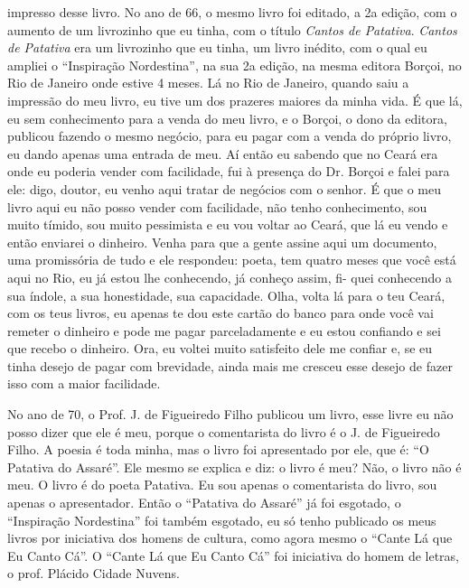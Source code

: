 impresso desse livro. No ano de 66, o mesmo livro foi editado, a 2a
edição, com o aumento de um livrozinho que eu tinha, com o título
\emph{Cantos de Patativa}. \emph{Cantos de Patativa} era um livrozinho que
eu tinha, um livro inédito, com o qual eu ampliei o ``Inspiração
Nordestina'', na sua 2a edição, na mesma editora Borçoi, no Rio de
Janeiro onde estive 4 meses. Lá no Rio de Janeiro, quando saiu a
impressão do meu livro, eu tive um dos prazeres maiores da minha vida. É
que lá, eu sem conhecimento para a venda do meu livro, e o Borçoi, o
dono da editora, publicou fazendo o mesmo negócio, para eu pagar com a
venda do próprio livro, eu dando apenas uma entrada de meu. Aí então eu
sabendo que no Ceará era onde eu poderia vender com facilidade, fui à
presença do Dr. Borçoi e falei para ele: digo, doutor, eu venho aqui
tratar de negócios com o senhor. É que o meu livro aqui eu não posso
vender com facilidade, não tenho conhecimento, sou muito tímido, sou
muito pessimista e eu vou voltar ao Ceará, que lá eu vendo e então
enviarei o dinheiro. Venha para que a gente assine aqui um documento,
uma promissória de tudo e ele respondeu: poeta, tem quatro meses que
você está aqui no Rio, eu já estou lhe conhecendo, já conheço assim, fi-
quei conhecendo a sua índole, a sua honestidade, sua capacidade. Olha,
volta lá para o teu Ceará, com os teus livros, eu apenas te dou este
cartão do banco para onde você vai remeter o dinheiro e pode me pagar
parceladamente e eu estou confiando e sei que recebo o dinheiro. Ora, eu
voltei muito satisfeito dele me confiar e, se eu tinha desejo de pagar
com brevidade, ainda mais me cresceu esse desejo de fazer isso com a
maior facilidade.

No ano de 70, o Prof. J. de Figueiredo Filho publicou um livro, esse
livre eu não posso dizer que ele é meu, porque o comentarista do livro
é o J. de Figueiredo Filho. A poesia é toda minha, mas o livro foi
apresentado por ele, que é: ``O Patativa do Assaré''. Ele mesmo se
explica e diz: o livro é meu? Não, o livro não é meu. O livro é do poeta
Patativa. Eu sou apenas o comentarista do livro, sou apenas
o apresentador. Então o ``Patativa do Assaré'' já foi esgotado, o
``Inspiração Nordestina'' foi também esgotado, eu só tenho publicado os
meus livros por iniciativa dos homens de cultura, como agora mesmo o
``Cante Lá que Eu Canto Cá''. O ``Cante Lá que Eu Canto Cá'' foi
iniciativa do homem de letras, o prof. Plácido Cidade Nuvens.

